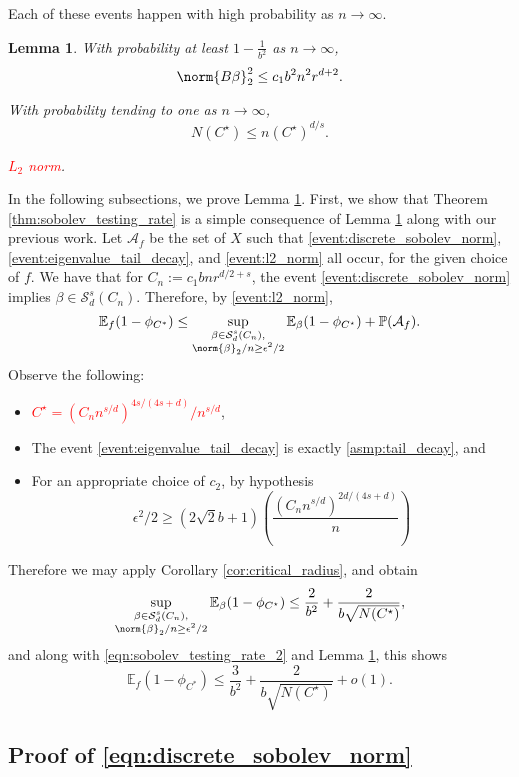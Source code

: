 \documentclass{article}
\newcommand{\1}{\mathbf{1}}
\newcommand{\Pbb}{\mathbb{P}}
\newcommand{\Ebb}{\mathbb{E}}
\theoremstyle{alden}
\theoremstyle{aldenthm}
\newtheorem{lemma}{Lemma}
\theoremstyle{definition}
\theoremstyle{remark}
\begin{document}
Each of these events happen with high probability as $n \to \infty$.
\begin{lemma}
	\label{lem:high_probability_events}
	With probability at least $1 - \frac{1}{b^2}$ as $n \to \infty$,
	\begin{equation}
	\label{eqn:discrete_sobolev_norm}
	\norm{B\beta}_2^2 \leq c_1 b^2 n^2 r^{d + 2}.
	\end{equation}
	
	With probability tending to one as $n \to \infty$,
	\begin{equation}
	\label{eqn:eigenvalue_tail_decay}
	N(C^{\star}) \leq n(C^{\star})^{d/s}.
	\end{equation}
	
	\textcolor{red}{$L_2$ norm}.
\end{lemma}
In the following subsections, we prove Lemma \ref{lem:high_probability_events}. First, we show that Theorem \ref{thm:sobolev_testing_rate} is a simple consequence of Lemma \ref{lem:high_probability_events} along with our previous work. Let $\mathcal{A}_f$ be the set of $X$ such that \ref{event:discrete_sobolev_norm}, \ref{event:eigenvalue_tail_decay}, and \ref{event:l2_norm} all occur, for the given choice of $f$. We have that for $C_n := c_1bnr^{d/2 + s}$, the event \ref{event:discrete_sobolev_norm} implies $\beta \in \mathcal{S}_d^s(C_n)$. Therefore, by \ref{event:l2_norm},
\begin{equation}
\label{eqn:sobolev_testing_rate_2}
\Ebb_f(1 - \phi_{C^*}) \leq \sup_{\substack{\beta \in \mathcal{S}_d^{s}(C_n), \\ \norm{\beta}_2/n \geq \epsilon^2/2}} \Ebb_{\beta}(1 - \phi_{C^{\star}}) + \Pbb(\mathcal{A}_f).
\end{equation}
Observe the following: 
\begin{itemize}
	\item \textcolor{red}{$C^{\star} = (C_n n^{s/d})^{4s/(4s+d)}/n^{s/d}$},
	\item The event \ref{event:eigenvalue_tail_decay} is exactly \ref{asmp:tail_decay}, and 
	\item For an appropriate choice of $c_2$, by hypothesis
	\begin{equation*}
	\epsilon^2/2 \geq (2\sqrt{2}b + 1) \left(\frac{(C_n n^{s/d})^{2d/(4s + d)}}{n}\right)
	\end{equation*}
\end{itemize}
Therefore we may apply Corollary \ref{cor:critical_radius}, and obtain
\begin{equation*}
\sup_{\substack{\beta \in \mathcal{S}_d^{s}(C_n), \\ \norm{\beta}_2/n \geq \epsilon^2/2}} \Ebb_{\beta}(1 - \phi_{C^{\star}}) \leq \frac{2}{b^2} + \frac{2}{b\sqrt{N(C^{\star})}},
\end{equation*}
and along with \eqref{eqn:sobolev_testing_rate_2} and Lemma \ref{lem:high_probability_events}, this shows
\begin{equation*}
\Ebb_f(1 - \phi_{C^*}) \leq \frac{3}{b^2} + \frac{2}{b\sqrt{N(C^{\star})}} + o(1).
\end{equation*}

\subsection{Proof of \eqref{eqn:discrete_sobolev_norm}}
\end{document}
